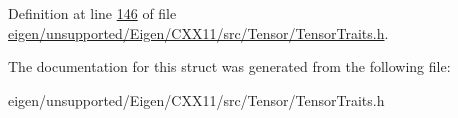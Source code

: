 Definition at line \hyperlink{eigen_2unsupported_2_eigen_2_c_x_x11_2src_2_tensor_2_tensor_traits_8h_source_l00146}{146} of file \hyperlink{eigen_2unsupported_2_eigen_2_c_x_x11_2src_2_tensor_2_tensor_traits_8h_source}{eigen/unsupported/\+Eigen/\+C\+X\+X11/src/\+Tensor/\+Tensor\+Traits.\+h}.



The documentation for this struct was generated from the following file\+:\begin{DoxyCompactItemize}
\item 
eigen/unsupported/\+Eigen/\+C\+X\+X11/src/\+Tensor/\+Tensor\+Traits.\+h\end{DoxyCompactItemize}
